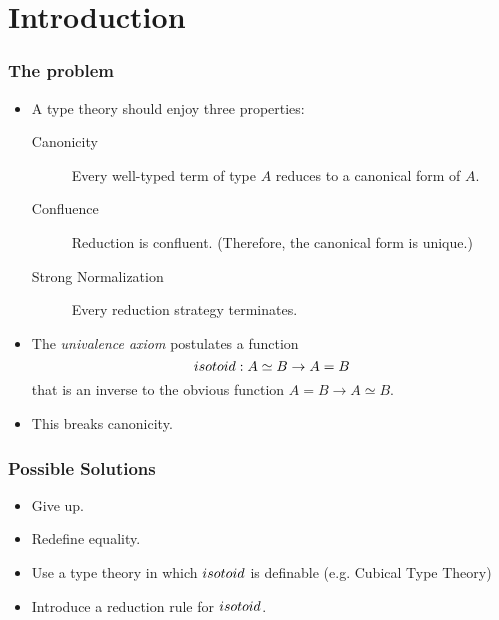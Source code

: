 \section{Introduction}

\begin{frame}
\frametitle{The problem}
\begin{itemize}
\item
A type theory should enjoy three properties:
\begin{description}
\item[Canonicity] Every well-typed term of type $A$ reduces to a canonical form of $A$.
\item[Confluence] Reduction is confluent.  (Therefore, the canonical form is unique.)
\item[Strong Normalization] Every reduction strategy terminates.
\end{description}
\item 
The \emph{univalence axiom} postulates a function
\[ isotoid : A \simeq B \rightarrow A = B \]
that is an inverse to the obvious function $A = B \rightarrow A \simeq B$.
\item
This breaks canonicity.
\end{itemize}
\end{frame}

\begin{frame}
\frametitle{Possible Solutions}
\begin{itemize}
\item
Give up.
\item
Redefine equality. %
\item
Use a type theory in which $isotoid$ is definable (e.g. Cubical Type Theory) %
\item
Introduce a reduction rule for $isotoid$.
\end{itemize}
\end{frame}

